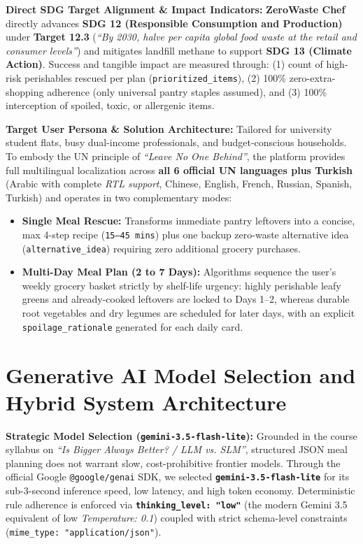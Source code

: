\documentclass[9pt,a4paper]{article}
\begin{document}
\textbf{Direct SDG Target Alignment \& Impact Indicators:} \textbf{ZeroWaste Chef} directly advances \textbf{SDG 12 (Responsible Consumption and Production)} under \textbf{Target 12.3} (\emph{``By 2030, halve per capita global food waste at the retail and consumer levels''}) and mitigates landfill methane to support \textbf{SDG 13 (Climate Action)}. Success and tangible impact are measured through: (1) count of high-risk perishables rescued per plan (\texttt{prioritized\_items}), (2) 100\% zero-extra-shopping adherence (only universal pantry staples assumed), and (3) 100\% interception of spoiled, toxic, or allergenic items.

\textbf{Target User Persona \& Solution Architecture:} Tailored for university student flats, busy dual-income professionals, and budget-conscious households. To embody the UN principle of \emph{``Leave No One Behind''}, the platform provides full multilingual localization across \textbf{all 6 official UN languages plus Turkish} (Arabic with complete \emph{RTL support}, Chinese, English, French, Russian, Spanish, Turkish) and operates in two complementary modes:
\begin{itemize}
  \item \textbf{Single Meal Rescue:} Transforms immediate pantry leftovers into a concise, max 4-step recipe (\texttt{15--45 mins}) plus one backup zero-waste alternative idea (\texttt{alternative\_idea}) requiring zero additional grocery purchases.
  \item \textbf{Multi-Day Meal Plan (2 to 7 Days):} Algorithms sequence the user's weekly grocery basket strictly by shelf-life urgency: highly perishable leafy greens and already-cooked leftovers are locked to Days 1--2, whereas durable root vegetables and dry legumes are scheduled for later days, with an explicit \texttt{spoilage\_rationale} generated for each daily card.
\end{itemize}

\section{Generative AI Model Selection and Hybrid System Architecture}
\textbf{Strategic Model Selection (\texttt{gemini-3.5-flash-lite}):} Grounded in the course syllabus on \emph{``Is Bigger Always Better? / LLM vs. SLM''}, structured JSON meal planning does not warrant slow, cost-prohibitive frontier models. Through the official Google \texttt{@google/genai} SDK, we selected \textbf{\texttt{gemini-3.5-flash-lite}} for its sub-3-second inference speed, low latency, and high token economy. Deterministic rule adherence is enforced via \textbf{\texttt{thinking\_level: "low"}} (the modern Gemini 3.5 equivalent of low \emph{Temperature: 0.1}) coupled with strict schema-level constraints (\texttt{mime\_type: "application/json"}).
\end{document}
